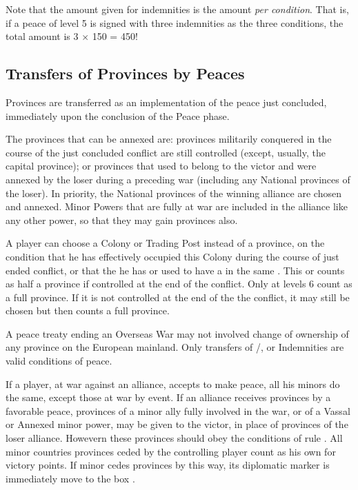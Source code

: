 \aparag[Indemnities] Note that the amount given for indemnities is the amount
\emph{per condition}. That is, if a peace of level 5 is signed with three
indemnities as the three conditions, the total amount is 3 $\times$ 150 =
450\ducats !



\subsection{Transfers of Provinces by Peaces}\label{chPeace:Tranfer
  Provinces Peace}

\aparag Provinces are transferred as an implementation of the peace just
concluded, immediately upon the conclusion of the Peace phase.

The provinces that can be annexed are:
\bparag provinces militarily conquered in the course of the just concluded
conflict are still controlled (except, usually, the capital province);
\bparag or provinces that used to belong to the victor and were annexed by the
loser during a preceding war (including any National provinces of the loser).
\bparag In priority, the National provinces of the winning alliance are
chosen and annexed.
\bparag Minor Powers that are fully at war are included in the alliance like
any other power, so that they may gain provinces also.

A player can choose a Colony or Trading Post instead of a province, on the
condition that he has effectively occupied this Colony during the course of
just ended conflict, or that the he has or used to have a \COL in the same
.
\bparag This \COL or \TP counts as half a province if controlled at the end of
the conflict.  Only \COL at levels 6 count as a full province.
\bparag If it is not controlled at the end of the the conflict, it may still
be chosen but then counts a full province.

A peace treaty ending an Overseas War may not involved change of ownership of
any province on the European mainland. Only transfers of \TP/\COL, %
or Indemnities are valid conditions of peace.

If a player, at war against an alliance, accepts to make peace, all his minors
do the same, except those at war by event.
\bparag If an alliance receives provinces by a favorable peace, provinces of a
minor ally fully involved in the war, or of a Vassal or Annexed minor power,
may be given to the victor, in place of provinces of the loser
alliance. Howevern these provinces should obey the conditions of rule
.
\bparag All minor countries provinces ceded by the controlling player count as
his own for victory points.
\bparag If minor cedes provinces by this way, its diplomatic marker is
immediately move to the box \Neutral.



